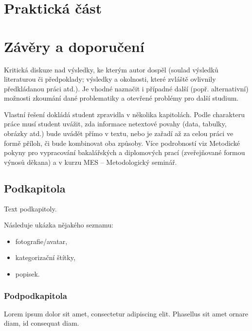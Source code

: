 \section{Praktická část}


\section{Závěry a doporučení}


Kritická diskuze nad výsledky, ke kterým autor dospěl (soulad výsledků  literaturou či předpoklady;
výsledky a okolnosti, které zvláště ovlivnily předkládanou práci atd.).
Je vhodné naznačit i případné další
(popř. alternativní) možnosti zkoumání dané problematiky a otevřené problémy pro další studium.


Vlastní řešení dokládá student zpravidla v několika kapitolách.
Podle charakteru práce musí student uvážit, zda informace
netextové povahy (data, tabulky, obrázky atd.) bude uvádět přímo v textu, nebo je zařadí až za celou práci ve formě příloh, či bude kombinovat oba způsoby.
Více podrobností viz Metodické pokyny pro vypracování bakalářských a diplomových prací (zveřejňované formou výnosů děkana)
a v kurzu MES – Metodologický seminář.

	\subsection{Podkapitola}

	Text podkapitoly.

	Následuje ukázka nějakého seznamu:
	\begin{itemize}
		\item fotografie/avatar,
		\item kategorizační štítky,
		\item popisek.
	\end{itemize}

		\subsubsection{Podpodkapitola}

		Lorem ipsum dolor sit amet, consectetur adipiscing elit. Phasellus sit amet ornare diam, id consequat diam.


